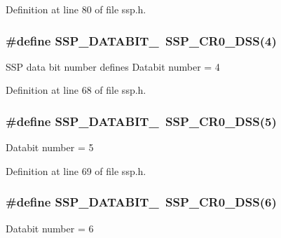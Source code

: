 Definition at line 80 of file ssp.\+h.

\subsubsection[{\texorpdfstring{S\+S\+P\+\_\+\+D\+A\+T\+A\+B\+I\+T\+\_\+4}{SSP_DATABIT_4}}]{\setlength{\rightskip}{0pt plus 5cm}\#define S\+S\+P\+\_\+\+D\+A\+T\+A\+B\+I\+T\+\_~{\bf S\+S\+P\+\_\+\+C\+R0\+\_\+\+D\+SS}(4)}\hypertarget{group___s_s_p___public___macros_ga238b6583278a25eba784cc4084ecd87f}{}\label{group___s_s_p___public___macros_ga238b6583278a25eba784cc4084ecd87f}
S\+SP data bit number defines Databit number = 4 

Definition at line 68 of file ssp.\+h.

\subsubsection[{\texorpdfstring{S\+S\+P\+\_\+\+D\+A\+T\+A\+B\+I\+T\+\_\+5}{SSP_DATABIT_5}}]{\setlength{\rightskip}{0pt plus 5cm}\#define S\+S\+P\+\_\+\+D\+A\+T\+A\+B\+I\+T\+\_~{\bf S\+S\+P\+\_\+\+C\+R0\+\_\+\+D\+SS}(5)}\hypertarget{group___s_s_p___public___macros_gaaab22a8bc9a3fdbf77451c0a71970f29}{}\label{group___s_s_p___public___macros_gaaab22a8bc9a3fdbf77451c0a71970f29}
Databit number = 5 

Definition at line 69 of file ssp.\+h.

\subsubsection[{\texorpdfstring{S\+S\+P\+\_\+\+D\+A\+T\+A\+B\+I\+T\+\_\+6}{SSP_DATABIT_6}}]{\setlength{\rightskip}{0pt plus 5cm}\#define S\+S\+P\+\_\+\+D\+A\+T\+A\+B\+I\+T\+\_~{\bf S\+S\+P\+\_\+\+C\+R0\+\_\+\+D\+SS}(6)}\hypertarget{group___s_s_p___public___macros_gaab15bd61146f368a6eae98cb47586aa9}{}\label{group___s_s_p___public___macros_gaab15bd61146f368a6eae98cb47586aa9}
Databit number = 6 

